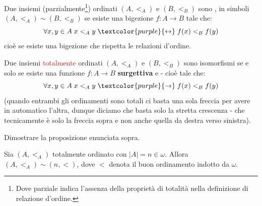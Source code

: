 \begin{definition}[Isomorfismo]
	Due insiemi (parzialmente\footnote{Dove parziale indica l'assenza della proprietà di totalità nella definizione di relazione d'ordine.}) ordinati
	$(A,<_A)$ e $(B,<_B)$ sono , in simboli $(A,<_A) \sim (B,<_B)$ se esiste una bigezione $f : A \rightarrow B$ tale che:
	\[ \forall x,y \in A \; x <_A y \; \textcolor{purple}{\leftrightarrow} \; f(x) <_B f(y)
		\]
	cioè se esiste una bigezione che rispetta le relazioni d'ordine.
\end{definition}

\begin{remark}
	Due insiemi \textcolor{red}{totalmente} ordinati $(A,<_A)$ e $(B,<_B)$ sono isomorfismi se e solo se esiste una funzione $f : A \rightarrow B$ \textbf{surgettiva} e  - cioè tale che:
	\[ \forall x,y \in A \; x <_A y \; \textcolor{purple}{\rightarrow} \; f(x) <_B f(y)
		\]
	(quando entrambi gli ordinamenti sono totali ci basta una sola freccia per avere in automatico l'altra, dunque diciamo che basta solo la stretta crescenza - che tecnicamente è solo la freccia sopra e non anche quella da destra verso sinistra).
\end{remark}

\begin{exercise}
	Dimostrare la proposizione enunciata sopra.
\end{exercise}

\begin{remark}
	Sia $(A,<_A)$ totalmente ordinato con $|A| = n \in \omega$. Allora $(A,<_A) \sim (n,<)$, dove $<$ denota il buon ordinamento indotto da $\omega$.
\end{remark}

